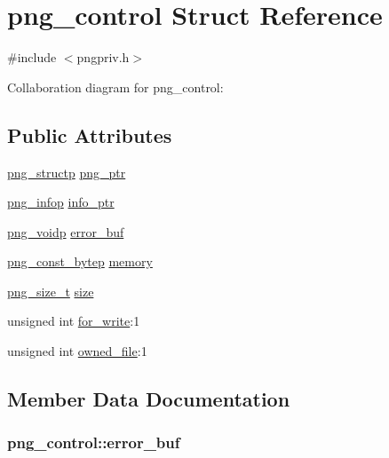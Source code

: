 \hypertarget{structpng__control}{}\section{png\+\_\+control Struct Reference}
\label{structpng__control}


{\ttfamily \#include $<$pngpriv.\+h$>$}



Collaboration diagram for png\+\_\+control\+:
\subsection*{Public Attributes}
\begin{DoxyCompactItemize}
\item 
\hyperlink{png_8h_a05b958915368d6bbd797ef70f24b9ff6}{png\+\_\+structp} \hyperlink{structpng__control_a43333534632030e056daf3afa48db51e}{png\+\_\+ptr}
\item 
\hyperlink{png_8h_ae3fea93b4964dd221f5ef0f88690dd68}{png\+\_\+infop} \hyperlink{structpng__control_a224678ad762ab6a868c085f78ae932d4}{info\+\_\+ptr}
\item 
\hyperlink{pngconf_8h_a9dc088c359b6d7e45682af63a3361b58}{png\+\_\+voidp} \hyperlink{structpng__control_a905bcfc3a2d1497bdfbbc0727cefd716}{error\+\_\+buf}
\item 
\hyperlink{pngconf_8h_a2e608af822427492832d11909c2f3fee}{png\+\_\+const\+\_\+bytep} \hyperlink{structpng__control_a96fa2f945a1d3163b6c1f79bf66f2ddd}{memory}
\item 
\hyperlink{pngconf_8h_a975e35d0a699ea3b08b8feef90fd29eb}{png\+\_\+size\+\_\+t} \hyperlink{structpng__control_acd4e0d9812d5efe466d5401268149ad9}{size}
\item 
unsigned int \hyperlink{structpng__control_aa8b880c377588bebcf2fd9af99d58e4f}{for\+\_\+write}\+:1
\item 
unsigned int \hyperlink{structpng__control_a6d275eb8c40d78757eec1cf96b128961}{owned\+\_\+file}\+:1
\end{DoxyCompactItemize}


\subsection{Member Data Documentation}
\hypertarget{structpng__control_a905bcfc3a2d1497bdfbbc0727cefd716}{}
\subsubsection[{error\+\_\+buf}]{ png\+\_\+control\+::error\+\_\+buf}\label{structpng__control_a905bcfc3a2d1497bdfbbc0727cefd716}
\hypertarget{structpng__control_aa8b880c377588bebcf2fd9af99d58e4f}{}
